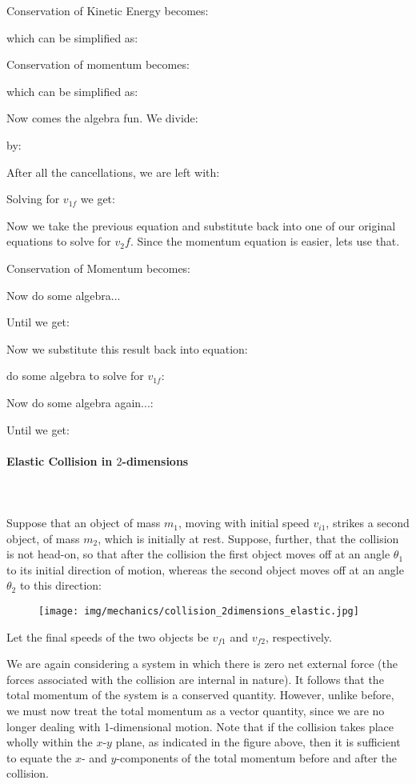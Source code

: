 	Conservation of Kinetic Energy becomes:
	
	which can be simplified as:
	
	Conservation of momentum becomes:
	
	which can be simplified as:
	
	Now comes the algebra fun. We divide:
	
	by:
	
	
	After all the cancellations, we are left with:
	
	Solving for $v_{1f}$ we get:
	
	Now we take the previous equation and substitute back into one of our original equations to solve for $v_2f$. Since the momentum equation is easier, lets use that.
	
	Conservation of Momentum becomes:
	
	Now do some algebra...
	
	Until we get:
	
	Now we substitute this result back into equation:
	
	 do some algebra to solve for $v_{1f}$:
	
	Now do some algebra again...:
	
	Until we get:
	
	
	\paragraph{Elastic Collision in $2$-dimensions}\mbox{}\\\\
	Suppose that an object of mass $m_1$, moving with initial speed $v_{i1}$, strikes a second object, of mass $m_2$, which is initially at rest. Suppose, further, that the collision is not head-on, so that after the collision the first object moves off at an angle $\theta_1$ to its initial direction of motion, whereas the second object moves off at an angle $\theta_2$ to this direction:
	\begin{figure}[H]
		\centering
		\texttt{[image: img/mechanics/collision\_2dimensions\_elastic.jpg]}
	\end{figure}
	 Let the final speeds of the two objects be $v_{f1}$ and $v_{f2}$, respectively.

	We are again considering a system in which there is zero net external force (the forces associated with the collision are internal in nature). It follows that the total momentum of the system is a conserved quantity. However, unlike before, we must now treat the total momentum as a vector quantity, since we are no longer dealing with 1-dimensional motion. Note that if the collision takes place wholly within the $x$-$y$ plane, as indicated in the figure above, then it is sufficient to equate the $x$- and $y$-components of the total momentum before and after the collision.

